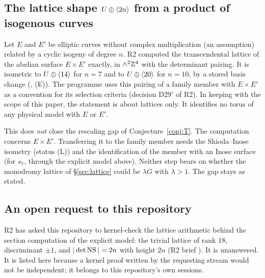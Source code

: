\subsection{The lattice shape \texorpdfstring{$U\oplus\langle 2n\rangle$}{U+<2n>} from a product of isogenous curves}
Let $E$ and $E'$ be elliptic curves without complex multiplication (an assumption) related by a cyclic isogeny
of degree $n$. R2 computed the transcendental lattice of the abelian surface $E\times E'$ exactly, in
$\wedge^2\mathbb{Z}^4$ with the determinant pairing. It is isometric to $U\oplus\langle 14\rangle$ for $n=7$ and to
$U\oplus\langle 20\rangle$ for $n=10$, by a stored basis change (, (E)). The programme uses
this pairing of a family member with $E\times E'$ as a convention for its selection criteria (decision D29$'$ of
R2). In keeping with the scope of this paper, the statement is about lattices only. It identifies no torus of
any physical model with $E$ or $E'$.

\begin{remark}
This does \emph{not} close the rescaling gap of Conjecture~\ref{conj:T}. The computation concerns $E\times E'$.
Transferring it to the family member needs the Shioda--Inose isometry (status (L)) and the identification of the
member with an Inose surface (for $s_7$, through the explicit model above). Neither step bears on whether the
monodromy lattice of \S\ref{sec:lattice} could be $\lambda G$ with $\lambda>1$. The gap stays as stated.
\end{remark}

\subsection{An open request to this repository}
R2 has asked this repository to kernel-check the lattice arithmetic behind the section computation of the
explicit model: the trivial lattice of rank $18$, discriminant $\pm1$, and $|\det\operatorname{NS}| = 2n$ with height $2n$
(R2 brief ). It is
unanswered. It is listed here because a kernel proof written by the requesting stream would not be independent;
it belongs to this repository's own sessions.

